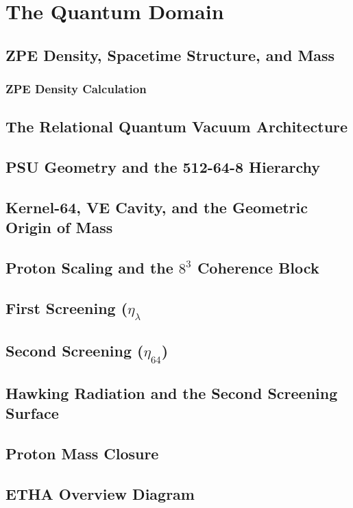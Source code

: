 \documentclass[12pt]{article}
\begin{document}

\section{The Quantum Domain}
\subsection{ZPE Density, Spacetime Structure, and Mass}
\subsubsection{ZPE Density Calculation}
\subsection{The Relational Quantum Vacuum Architecture}
\subsection{PSU Geometry and the 512-64-8 Hierarchy}
\subsection{Kernel-64, VE Cavity, and the Geometric Origin of Mass}
\subsection{Proton Scaling and the $8^3$ Coherence Block}
\subsection{First Screening ($\eta_\lambda$}
\subsection{Second Screening ($\eta_{64}$)}
\subsection{Hawking Radiation and the Second Screening Surface}
\subsection{Proton Mass Closure}
\subsection{ETHA Overview Diagram}
\end{document}

